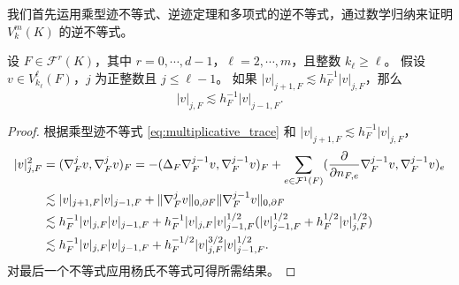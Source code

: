 我们首先运用乘型迹不等式、逆迹定理和多项式的逆不等式，通过数学归纳来证明 $V_k^m(K)$ 的逆不等式。
\begin{lemma}\label{lem:inverseinequality0}
设 $F\in\mathcal F^r(K)$，其中 $r=0,\cdots, d-1$，$\ell=2,\cdots, m$，且整数 $k_{\ell}\geq\ell$。
假设 $v\in V_{k_{\ell}}^{\ell}(F)$，$j$ 为正整数且 $j\leq\ell-1$。
如果 $|v|_{j+1,F}\lesssim h_F^{-1}|v|_{j,F}$，那么
\begin{equation*}%
|v|_{j,F}\lesssim h_F^{-1}|v|_{j-1,F}.
\end{equation*}
\end{lemma}
\begin{proof}
    \label{lemma:multiplicative_trace}
根据乘型迹不等式 \eqref{eq:multiplicative_trace} 和 $|v|_{j+1,F}\lesssim h_F^{-1}|v|_{j,F}$，
\begin{align*}
|v|_{j,F}^2&=(\nabla_F^jv, \nabla_F^jv)_F=-(\Delta_F\nabla_F^{j-1}v, \nabla_F^{j-1}v)_F+\sum_{e\in\mathcal F^1(F)}(\frac{\partial}{\partial n_{F,e}}\nabla_F^{j-1}v, \nabla_F^{j-1}v)_{e} \\
&\lesssim |v|_{j+1,F}|v|_{j-1,F} +\|\nabla_F^{j}v\|_{0,\partial F}\|\nabla_F^{j-1}v\|_{0,\partial F} \\
&\lesssim h_F^{-1}|v|_{j,F}|v|_{j-1,F}+h_F^{-1}|v|_{j, F}|v|_{j-1, F}^{1/2}(|v|_{j-1, F}^{1/2}+h_F^{1/2}|v|_{j, F}^{1/2})\\
&\lesssim h_F^{-1}|v|_{j,F}|v|_{j-1,F}+h_F^{-1/2}|v|_{j, F}^{3/2}|v|_{j-1, F}^{1/2}.
\end{align*}
对最后一个不等式应用杨氏不等式可得所需结果。
\end{proof}

